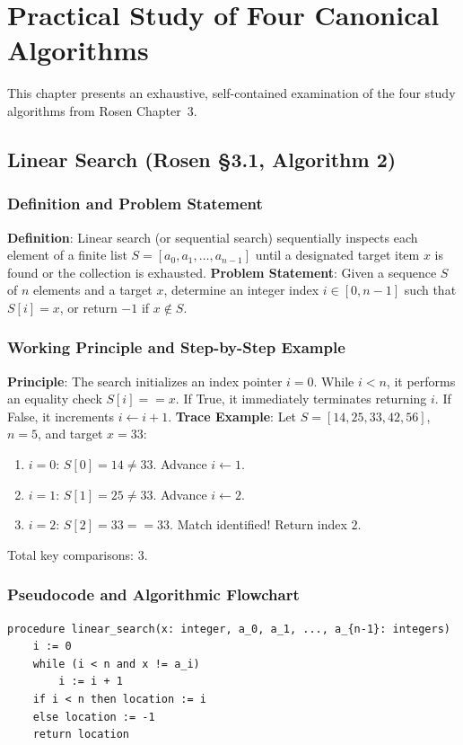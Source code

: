 \documentclass[11pt,a4paper,oneside]{report}
\theoremstyle{definition}
\begin{document}
\chapter{Practical Study of Four Canonical Algorithms}
\label{chap:practical_study}

This chapter presents an exhaustive, self-contained examination of the four study algorithms from Rosen Chapter~3.

\section{Linear Search (Rosen \S3.1, Algorithm 2)}

\subsection{Definition and Problem Statement}
\textbf{Definition}: Linear search (or sequential search) sequentially inspects each element of a finite list $S = [a_0, a_1, \dots, a_{n-1}]$ until a designated target item $x$ is found or the collection is exhausted.
\textbf{Problem Statement}: Given a sequence $S$ of $n$ elements and a target $x$, determine an integer index $i \in [0, n-1]$ such that $S[i] = x$, or return $-1$ if $x \notin S$.

\subsection{Working Principle and Step-by-Step Example}
\textbf{Principle}: The search initializes an index pointer $i = 0$. While $i < n$, it performs an equality check $S[i] == x$. If True, it immediately terminates returning $i$. If False, it increments $i \leftarrow i + 1$.
\textbf{Trace Example}: Let $S = [14, 25, 33, 42, 56]$, $n = 5$, and target $x = 33$:
\begin{enumerate}
    \item $i = 0$: $S[0] = 14 \ne 33$. Advance $i \leftarrow 1$.
    \item $i = 1$: $S[1] = 25 \ne 33$. Advance $i \leftarrow 2$.
    \item $i = 2$: $S[2] = 33 == 33$. Match identified! Return index $2$.
\end{enumerate}
Total key comparisons: 3.

\subsection{Pseudocode and Algorithmic Flowchart}
\begin{lstlisting}[caption={Pseudocode: Linear Search (Rosen \S3.1, Algorithm 2)}]
procedure linear_search(x: integer, a_0, a_1, ..., a_{n-1}: integers)
    i := 0
    while (i < n and x != a_i)
        i := i + 1
    if i < n then location := i
    else location := -1
    return location
\end{lstlisting}
\end{document}
